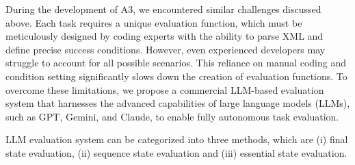 \documentclass[11pt]{article}
\begin{document}
During the development of A3, we encountered similar challenges discussed above. Each task requires a unique evaluation function, which must be meticulously designed by coding experts with the ability to parse XML and define precise success conditions. However, even experienced developers may struggle to account for all possible scenarios. This reliance on manual coding and condition setting significantly slows down the creation of evaluation functions. To overcome these limitations, we propose a commercial LLM-based evaluation system that harnesses the advanced capabilities of large language models (LLMs), such as GPT, Gemini, and Claude, to enable fully autonomous task evaluation.

LLM evaluation system can be categorized into three methods, which are (i) final state evaluation, (ii) sequence state evaluation and (iii) essential state evaluation.
\end{document}
